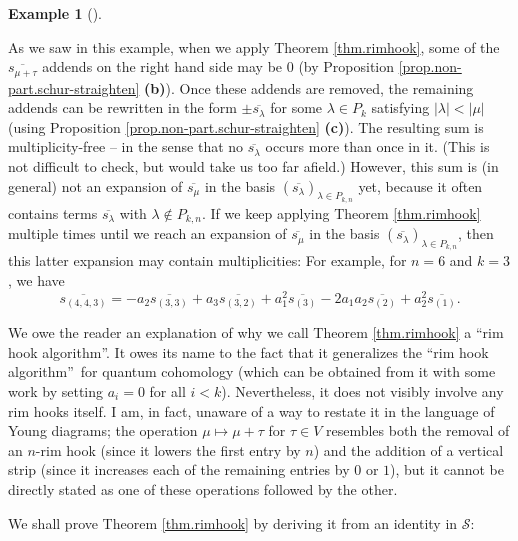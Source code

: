 \documentclass[numbers=enddot,12pt,final,onecolumn,notitlepage]{scrartcl}%
\theoremstyle{definition}
\newtheorem{exmp}[theo]{Example}
\newenvironment{example}[1][]
{\begin{exmp}[#1]\begin{leftbar}}
{\end{leftbar}\end{exmp}}
\begin{document}
\begin{example}
\end{example}

As we saw in this example, when we apply Theorem \ref{thm.rimhook}, some of
the $\overline{s_{\mu+\tau}}$ addends on the right hand side may be $0$ (by
Proposition \ref{prop.non-part.schur-straighten} \textbf{(b)}). Once these
addends are removed, the remaining addends can be rewritten in the form
$\pm\overline{s_{\lambda}}$ for some $\lambda\in P_{k}$ satisfying $\left\vert
\lambda\right\vert <\left\vert \mu\right\vert $ (using Proposition
\ref{prop.non-part.schur-straighten} \textbf{(c)}). The resulting sum is
multiplicity-free -- in the sense that no $\overline{s_{\lambda}}$ occurs more
than once in it. (This is not difficult to check, but would take us too far
afield.) However, this sum is (in general) not an expansion of $\overline
{s_{\mu}}$ in the basis $\left(  \overline{s_{\lambda}}\right)  _{\lambda\in
P_{k,n}}$ yet, because it often contains terms $\overline{s_{\lambda}}$ with
$\lambda\notin P_{k,n}$. If we keep applying Theorem \ref{thm.rimhook}
multiple times until we reach an expansion of $\overline{s_{\mu}}$ in the
basis $\left(  \overline{s_{\lambda}}\right)  _{\lambda\in P_{k,n}}$, then
this latter expansion may contain multiplicities: For example, for $n=6$ and
$k=3$, we have%
\[
\overline{s_{\left(  4,4,3\right)  }}=-a_{2}\overline{s_{\left(  3,3\right)
}}+a_{3}\overline{s_{\left(  3,2\right)  }}+a_{1}^{2}\overline{s_{\left(
3\right)  }}-2a_{1}a_{2}\overline{s_{\left(  2\right)  }}+a_{2}^{2}%
\overline{s_{\left(  1\right)  }}.
\]


We owe the reader an explanation of why we call Theorem \ref{thm.rimhook} a
\textquotedblleft rim hook algorithm\textquotedblright. It owes its name to
the fact that it generalizes the \textquotedblleft rim hook
algorithm\textquotedblright\ for quantum cohomology \cite[\S 2, Main
Lemma]{BeCiFu99} (which can be obtained from it with some work by setting
$a_{i}=0$ for all $i<k$). Nevertheless, it does not visibly involve any rim
hooks itself. I am, in fact, unaware of a way to restate it in the language of
Young diagrams; the operation $\mu\mapsto\mu+\tau$ for $\tau\in V$ resembles
both the removal of an $n$-rim hook (since it lowers the first entry by $n$)
and the addition of a vertical strip (since it increases each of the remaining
entries by $0$ or $1$), but it cannot be directly stated as one of these
operations followed by the other.

We shall prove Theorem \ref{thm.rimhook} by deriving it from an identity in
$\mathcal{S}$:
\end{document}
